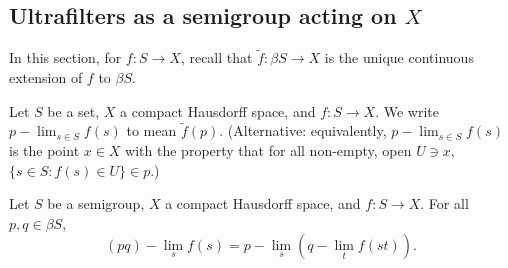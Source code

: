 


    

\subsection{Ultrafilters as a semigroup acting on $X$}



In this section, for $f: S \to X$, recall that $\tilde f: \beta S \to X$ is the unique continuous extension of $f$ to $\beta S$.

\begin{definition}[$p-\lim$]
\leanok{}
    Let $S$ be a set, $X$ a compact Hausdorff space, and $f: S \to X$.  We write $p-\lim_{s \in S} f(s)$ to mean $\tilde f (p)$.  (Alternative: equivalently, $p-\lim_{s \in S} f(s)$ is the point $x \in X$ with the property that for all non-empty, open $U \ni x$, $\{s \in S : f(s) \in U\} \in p$.)
\end{definition}

\begin{theorem}
\label{thm_pq_lim_is_plim_qlim}
\leanok{}
    Let $S$ be a semigroup, $X$ a compact Hausdorff space, and $f: S \to X$.  For all $p, q \in \beta S$,
    \[(pq)-\lim_s f(s) = p-\lim_s (q-\lim_t f(st)).\]
\end{theorem}

